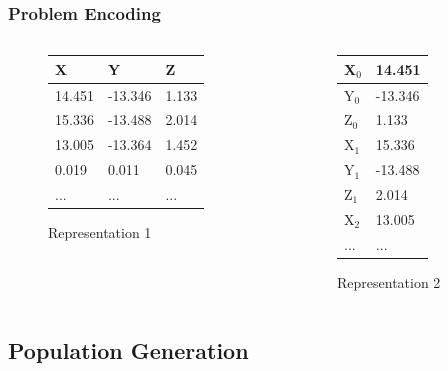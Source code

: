 \documentclass[10pt]{beamer}
\begin{document}
\begin{frame}
	\frametitle{Problem Encoding}

	\begin{columns}[T]
		\begin{column}{.5\textwidth}
			
			\begin{figure}
				\centering
				\begin{tabular}{ | l  l  l | }
					\hline
					X & Y & Z \\ \hline
					14.451 & -13.346 & 1.133 \\ \hline
					15.336 & -13.488 & 2.014 \\ \hline
					13.005 & -13.364 & 1.452 \\ \hline
					0.019 & 0.011 & 0.045 \\ \hline
					... & ... & ... \\ \hline
				\end{tabular}
				\caption{Representation 1}
			\end{figure}

		\end{column}
		\begin{column}{.5\textwidth}
			
			\begin{figure}
				\centering
				\begin{tabular}{ | l  l | }
					\hline
					X$_{0}$ & 14.451 \\ \hline
					Y$_{0}$ & -13.346 \\ \hline
					Z$_{0}$ & 1.133 \\ \hline
					X$_{1}$ & 15.336 \\ \hline
					Y$_{1}$ & -13.488 \\ \hline
					Z$_{1}$ & 2.014 \\ \hline
					X$_{2}$ & 13.005 \\ \hline
					... & ... \\ \hline
				\end{tabular}
				\caption{Representation 2}
			\end{figure}

		\end{column}
	\end{columns}
\end{frame}

\subsection{Population Generation}
\end{document}
